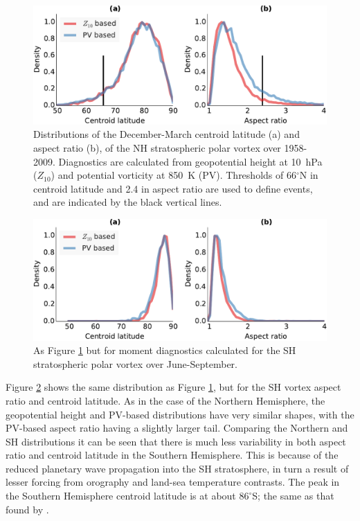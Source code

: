 \begin{figure}
  \centering
  \includegraphics[width=\textwidth]{figures/chapter-moments/moments_distribution_crop.pdf}
  \caption[NH distributions of $Z_{10}$ and PV-based moment
  diagnostics.]{Distributions of the December-March centroid latitude (a) and
    aspect ratio (b), of the NH stratospheric polar vortex over
    1958-2009. Diagnostics are calculated from geopotential height at 10~hPa
    ($Z_{10}$) and potential vorticity at 850~K (PV). Thresholds of
    66$^{\circ}$N in centroid latitude and 2.4 in aspect ratio are used to
    define events, and are indicated by the black vertical lines.}
  \label{fig:pv_z_moments_distribution}
\end{figure}

\begin{figure}
  \centering
  \includegraphics[width=\textwidth]{figures/chapter-moments/moments_distribution_crop_sh.pdf}
  \caption[SH distributions of $Z_{10}$ and PV-based moment diagnostics.]{As
    Figure \ref{fig:pv_z_moments_distribution} but for moment diagnostics
    calculated for the SH stratospheric polar vortex over
    June-September.}
  \label{fig:pv_z_moments_distribution_sh}
\end{figure}

Figure \ref{fig:pv_z_moments_distribution_sh} shows the same distribution as
Figure \ref{fig:pv_z_moments_distribution}, but for the SH vortex aspect ratio
and centroid latitude. As in the case of the Northern Hemisphere, the
geopotential height and PV-based distributions have very similar shapes, with
the PV-based aspect ratio having a slightly larger tail. Comparing the Northern
and SH distributions it can be seen that there is much less variability in both
aspect ratio and centroid latitude in the Southern Hemisphere. This is because
of the reduced planetary wave propagation into the SH stratosphere, in turn a
result of lesser forcing from orography and land-sea temperature contrasts. The
peak in the Southern Hemisphere centroid latitude is at about $86^{\circ}$S; the
same as that found by \citet{Waugh1999}.

